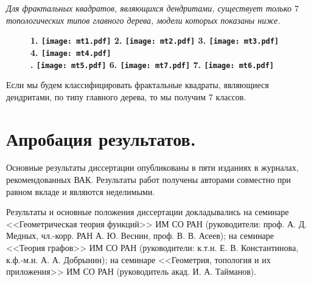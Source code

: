 \documentclass[a5paper,9pt,twoside]{extarticle} %
\begin{document}
{\em Для фрактальных квадратов, являющихся дендритами, существует только $7$ топологических типов главного дерева, модели которых показаны ниже.}
\begin{figure}[H]
    \centering \Large {\bf
    1. \texttt{[image: mt1.pdf]}
    \hfill
    2. \texttt{[image: mt2.pdf]}
    \hfill
    3. \texttt{[image: mt3.pdf]}
    \hfill
    4. \texttt{[image: mt4.pdf]}\\
    . \texttt{[image: mt5.pdf]}
    \hfill
    6. \texttt{[image: mt7.pdf]}
    \hfill
    7. \texttt{[image: mt6.pdf]}}
\end{figure}

Если мы будем классифицировать фрактальные квадраты, являющиеся дендритами, по типу главного дерева, то мы получим 7 классов.




\section{Апробация результатов.}

Основные результаты диссертации опубликованы в пяти изданиях \cite{DST2021, DST2022, TD2022fs, TD2023fs, VDT2020} в журналах, рекомендованных ВАК.
Результаты работ \cite{DST2021, DST2022, TD2022fs, TD2023fs, VDT2020} получены авторами совместно при равном вкладе и являются неделимыми.

Результаты и основные положения диссертации докладывались на семинаре <<Геометрическая теория функций>> ИМ СО РАН (руководители:
проф. А. Д. Медных, чл.-корр. РАН А. Ю. Веснин, проф. В. В. Асеев); на семинаре <<Теория графов>> ИМ СО РАН (руководители: к.т.н. Е. В. Константинова, к.ф.-м.н. А. А. Добрынин); на семинаре <<Геометрия, топология и их приложения>> ИМ СО РАН (руководитель акад. И. А. Тайманов).
\end{document}
